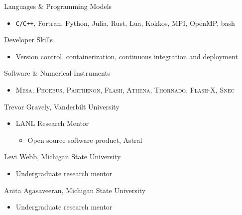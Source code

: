\documentclass[11pt]{vitae}
\begin{document}
\begin{genericlist}
\item[] Languages \& Programming Models
\begin{itemize}
  \item[] \texttt{C/C++}, Fortran, Python, Julia, Rust, Lua, Kokkos, MPI, OpenMP, bash
\end{itemize}
\item[] Developer Skills
\begin{itemize}
  \item[] Version control, containerization, continuous integration and deployment
\end{itemize}
\item[] Software \& Numerical Instruments
\begin{itemize}
        \item[] \textsc{Mesa}, \textsc{Phoebus}, \textsc{Parthenon}, \textsc{Flash}, \textsc{Athena}, \textsc{Thornado}, \textsc{Flash-X}, \textsc{Snec}
\end{itemize}
\end{genericlist}

\begin{genericlist}
\item[] Trevor Gravely, Vanderbilt University
\begin{itemize}
        \item[] LANL Research Mentor
  \begin{itemize}
          \item[] Open source software product, Astral
  \end{itemize}
\end{itemize}
\item[] Levi Webb, Michigan State University
\begin{itemize}
\item[] Undergraduate research mentor
\end{itemize}
\item[] Anita Agasaveeran, Michigan State University
\begin{itemize}
\item[] Undergraduate research mentor
\end{itemize}
\end{genericlist}

%
%
%
%
\end{document}
